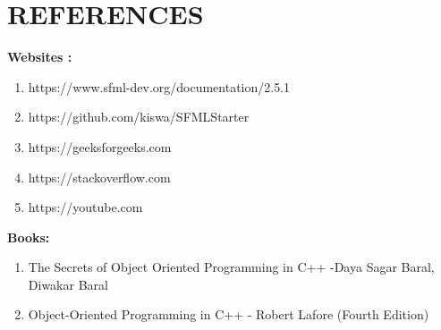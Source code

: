 \newpage
\section{REFERENCES}

\textbf{Websites :}
\begin{enumerate}

\item https://www.sfml-dev.org/documentation/2.5.1
\item https://github.com/kiswa/SFMLStarter
\item https://geeksforgeeks.com
\item https://stackoverflow.com
\item https://youtube.com

		
\end{enumerate}

\textbf{Books: }
\begin{enumerate}
	\item The Secrets of Object Oriented Programming in C++ -Daya Sagar Baral, Diwakar Baral
	\item Object-Oriented Programming in C++ - Robert Lafore (Fourth Edition)
\end{enumerate}